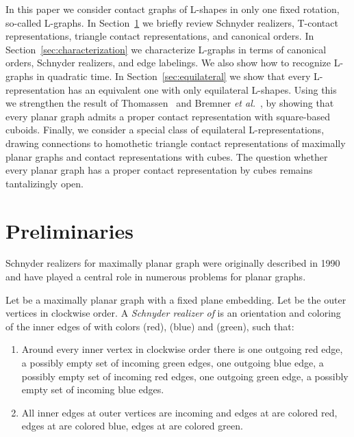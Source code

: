 \documentclass{llncs}
\begin{document}
\medskip
{}
In this paper we consider contact graphs of L-shapes in only one fixed rotation, so-called L-graphs.
In Section~\ref{sec:preliminaries} we briefly review Schnyder realizers, T-contact representations, triangle contact representations, and canonical orders.
In Section~\ref{sec:characterization} we characterize L-graphs in terms of canonical orders, Schnyder realizers, and edge labelings.
We also show how to recognize L-graphs in quadratic time.
In Section~\ref{sec:equilateral} we show that every L-representation has an equivalent one with only equilateral L-shapes. Using this we strengthen the result of Thomassen~\cite{Thomassen86} and Bremner {\em et al.}~\cite{cubes12}, by showing that every planar graph admits a proper contact representation with square-based cuboids.
Finally, we consider a special class of equilateral L-representations, drawing connections to homothetic triangle contact representations of maximally planar graphs and contact representations with cubes.
The question whether every planar graph has a proper contact representation by cubes remains tantalizingly open.


\section{Preliminaries}\label{sec:preliminaries}

Schnyder realizers for maximally planar graph were originally described in 1990~\cite{s-epgg-90} and have played a central role in numerous problems for planar graphs.

\begin{definition}
 Let  be a maximally planar graph with a fixed plane embedding. Let  be the outer vertices in clockwise order. A \emph{Schnyder realizer of } is an orientation and coloring of the inner edges of  with colors  (red),  (blue) and  (green), such that:
 \begin{enumerate}[label =(\roman*)]
  \item Around every inner vertex  in clockwise order there is one outgoing red edge, a possibly empty set of incoming green edges, one outgoing blue edge, a possibly empty set of incoming red edges, one outgoing green edge, a possibly empty set of incoming blue edges.
  \item All inner edges at outer vertices are incoming and edges at  are colored red, edges at  are colored blue, edges at  are colored green.
 \end{enumerate}
\end{definition}
\end{document}
